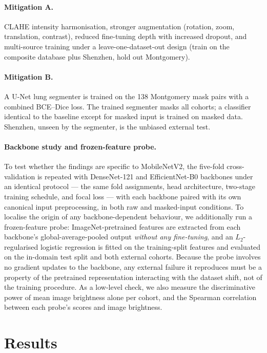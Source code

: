 \documentclass{article}
\begin{document}
\paragraph{Mitigation A.}
CLAHE intensity harmonisation, stronger augmentation (rotation, zoom, translation, contrast),
reduced fine-tuning depth with increased dropout, and multi-source training under a
leave-one-dataset-out design (train on the composite database plus Shenzhen, hold out Montgomery).

\paragraph{Mitigation B.}
A U-Net \citep{ronneberger2015unet} lung segmenter is trained on the 138 Montgomery mask pairs with
a combined BCE--Dice loss. The trained segmenter masks all cohorts; a classifier identical to the
baseline except for masked input is trained on masked data. Shenzhen, unseen by the segmenter, is
the unbiased external test.

\paragraph{Backbone study and frozen-feature probe.}
To test whether the findings are specific to MobileNetV2, the five-fold cross-validation is
repeated with DenseNet-121 and EfficientNet-B0 backbones under an identical protocol --- the same
fold assignments, head architecture, two-stage training schedule, and focal loss --- with each
backbone paired with its own canonical input preprocessing, in both raw and masked-input
conditions. To localise the origin of any backbone-dependent behaviour, we additionally run a
frozen-feature probe: ImageNet-pretrained features are extracted from each backbone's
global-average-pooled output \emph{without any fine-tuning}, and an $L_2$-regularised logistic
regression is fitted on the training-split features and evaluated on the in-domain test split and
both external cohorts. Because the probe involves no gradient updates to the backbone, any external
failure it reproduces must be a property of the pretrained representation interacting with the
dataset shift, not of the training procedure. As a low-level check, we also measure the
discriminative power of mean image brightness alone per cohort, and the Spearman correlation
between each probe's scores and image brightness.

\section{Results}
\end{document}

